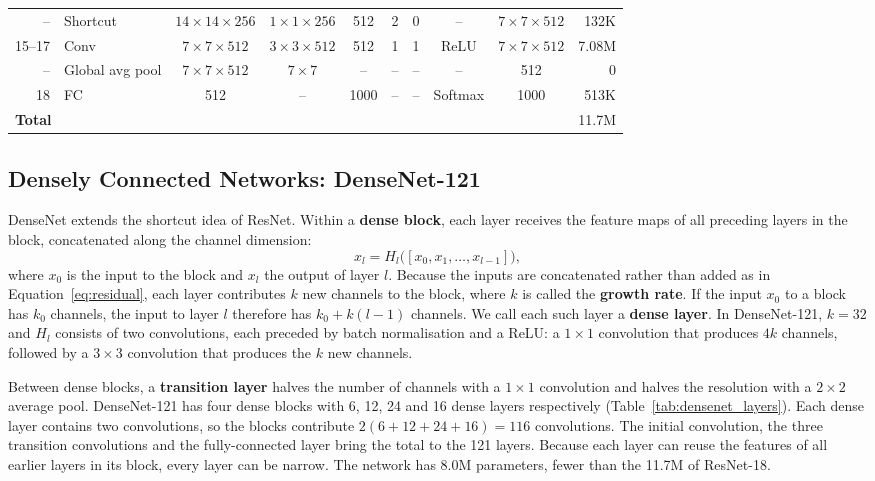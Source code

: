 \begin{table}[!htb]
\begin{tabular}{rlcccccccr}
--       & Shortcut        & $14\times14\times256$ & $1\times1\times256$   & 512  & 2 & 0 & --      & $7\times7\times512$    & 132K  \\
15--17   & Conv            & $7\times7\times512$   & $3\times3\times512$   & 512  & 1 & 1 & ReLU    & $7\times7\times512$    & 7.08M \\
--       & Global avg pool & $7\times7\times512$   & $7\times7$            & --   & -- & -- & --     & 512                    & 0     \\
18       & FC              & 512                   & --                    & 1000 & -- & -- & Softmax & 1000                  & 513K  \\
\midrule
\multicolumn{9}{l}{\textbf{Total}} & 11.7M \\
\bottomrule
\end{tabular}
\end{table}

\FloatBarrier
\subsection{Densely Connected Networks: DenseNet-121}\label{sec:densenet}

DenseNet \citep{huang2017densenet} extends the shortcut idea of ResNet. Within a \textbf{dense block}, each layer receives the feature maps of all preceding layers in the block, concatenated along the channel dimension:
\begin{equation}
x_l = H_l\big([x_0, x_1, \dots, x_{l-1}]\big),
\label{eq:densenet}
\end{equation}
where $x_0$ is the input to the block and $x_l$ the output of layer $l$. Because the inputs are concatenated rather than added as in Equation~\ref{eq:residual}, each layer contributes $k$ new channels to the block, where $k$ is called the \textbf{growth rate}. If the input $x_0$ to a block has $k_0$ channels, the input to layer $l$ therefore has $k_0 + k(l-1)$ channels. We call each such layer a \textbf{dense layer}. In DenseNet-121, $k=32$ and $H_l$ consists of two convolutions, each preceded by batch normalisation and a ReLU: a $1\times1$ convolution that produces $4k$ channels, followed by a $3\times3$ convolution that produces the $k$ new channels.

Between dense blocks, a \textbf{transition layer} halves the number of channels with a $1\times1$ convolution and halves the resolution with a $2\times2$ average pool. DenseNet-121 has four dense blocks with 6, 12, 24 and 16 dense layers respectively (Table~\ref{tab:densenet_layers}). Each dense layer contains two convolutions, so the blocks contribute $2(6+12+24+16) = 116$ convolutions. The initial convolution, the three transition convolutions and the fully-connected layer bring the total to the 121 layers. Because each layer can reuse the features of all earlier layers in its block, every layer can be narrow. The network has 8.0M parameters, fewer than the 11.7M of ResNet-18.

